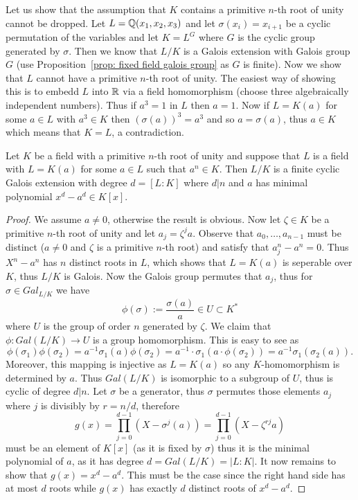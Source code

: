 \documentclass[twoside, a4paper, 10pt]{amsart}
\begin{document}
\begin{eg} Let us show that the assumption that $K$ contains a primitive $n$-th root of unity cannot be dropped. Let $L = \mathbb{Q}(x_1,x_2,x_3)$ and let $\sigma(x_i) = x_{i+1}$ be a cyclic permutation of the variables and let $K = L^{G}$ where $G$ is the cyclic group generated by $\sigma$. Then we know that $L/K$ is a Galois extension with Galois group $G$ (use Proposition~\ref{prop: fixed field galois group} as $G$ is finite). Now we show that $L$ cannot have a primitive $n$-th root of unity. The easiest way of showing this is to embedd $L$ into $\mathbb{R}$ via a field homomorphism (choose three algebraically independent numbers). Thus if $a^3 = 1$ in $L$ then $a=1$. Now if $L=K(a)$ for some $a \in L$ with $a^3 \in K$ then $(\sigma(a))^3 = a^3$ and so $a = \sigma(a)$, thus $a \in K$ which means that $K = L$, a contradiction. \end{eg}

\begin{prop}\label{prop: radicals implies cyclic galois} Let $K$ be a field with a primitive $n$-th root of unity and suppose that $L$ is a field with $L=K(a)$ for some $a \in L$ such that $a^n \in K$. Then $L/K$ is a finite cyclic Galois extension with degree $d = [L:K]$ where $d | n$ and $a$ has minimal polynomial $x^d - a^d \in K[x]$.

\end{prop}

\begin{proof} We assume $a \neq 0$, otherwise the result is obvious. Now let $\zeta \in K$ be a primitive $n$-th root of unity and let $a_j = \zeta^j a$. Observe that $a_0, \ldots, a_{n-1}$ must be distinct ($a \neq 0$ and $\zeta$ is a primitive $n$-th root) and satisfy that $a_j^n - a^n =0$. Thus $X^n - a^n$ has $n$ distinct roots in $L$, which shows that $L=K(a)$ is seperable over $K$, thus $L/K$ is Galois. Now the Galois group permutes that $a_j$, thus for $\sigma \in Gal_{L/K}$ we have $$\phi(\sigma) := \frac{\sigma(a)}{a} \in U \subset K^{*}$$ where $U$ is the group of order $n$ generated by $\zeta$. We claim that $\phi:Gal(L/K) \to U$ is a group homomorphism. This is easy to see as $$\phi(\sigma_1) \phi(\sigma_2) = a^{-1} \sigma_1(a) \phi(\sigma_2) = a^{-1}\cdot \sigma_1(a \cdot \phi(\sigma_2)) = a^{-1}\sigma_1(\sigma_2(a)).$$ Moreover, this mapping is injective as $L=K(a)$ so any $K$-homomorphism is determined by $a$. Thus $Gal(L/K)$ is isomorphic to a subgroup of $U$, thus is cyclic of degree $d | n$. Let $\sigma$ be a generator, thus $\sigma$ permutes those elements $a_j$ where $j$ is divisibly by $r = n/d$, therefore $$g(x) = \prod_{j=0}^{d-1}(X - \sigma^j(a)) = \prod_{j=0}^{d-1}(X - \zeta^{rj} a)$$ must be an element of $K[x]$ (as it is fixed by $\sigma$) thus it is the minimal polynomial of $a$, as it has degree $d = Gal(L/K) = |L:K|$. It now remains to show that $g(x) = x^d - a^d$. This must be the case since the right hand side has at most $d$ roots while $g(x)$ has exactly $d$ distinct roots of $x^d - a^d$. \end{proof}
\end{document}
